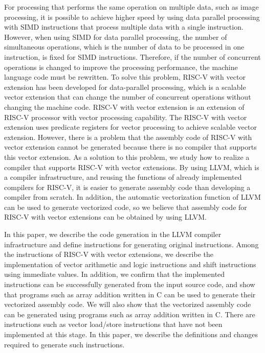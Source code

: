 For processing that performs the same operation on multiple data, such as image processing, it is possible to achieve higher speed by using data parallel processing with SIMD instructions that process multiple data with a single instruction.
However, when using SIMD for data parallel processing, the number of simultaneous operations, which is the number of data to be processed in one instruction, is fixed for SIMD instructions. Therefore, if the number of concurrent operations is changed to improve the processing performance, the machine language code must be rewritten.
To solve this problem, RISC-V with vector extension has been developed for data-parallel processing, which is a scalable vector extension that can change the number of concurrent operations without changing the machine code. RISC-V with vector extension is an extension of RISC-V processor with vector processing capability. The RISC-V with vector extension uses predicate registers for vector processing to achieve scalable vector extension.
However, there is a problem that the assembly code of RISC-V with vector extension cannot be generated because there is no compiler that supports this vector extension. As a solution to this problem, we study how to realize a compiler that supports RISC-V with vector extensions. By using LLVM, which is a compiler infrastructure, and reusing the functions of already implemented compilers for RISC-V, it is easier to generate assembly code than developing a compiler from scratch. In addition, the automatic vectorization function of LLVM can be used to generate vectorized code, so we believe that assembly code for RISC-V with vector extensions can be obtained by using LLVM.

In this paper, we describe the code generation in the LLVM compiler infrastructure and define instructions for generating original instructions. Among the instructions of RISC-V with vector extensions, we describe the implementation of vector arithmetic and logic instructions and shift instructions using immediate values.
In addition, we confirm that the implemented instructions can be successfully generated from the input source code, and show that programs such as array addition written in C can be used to generate their vectorized assembly code.
We will also show that the vectorized assembly code can be generated using programs such as array addition written in C. There are instructions such as vector load/store instructions that have not been implemented at this stage. In this paper, we describe the definitions and changes required to generate such instructions.